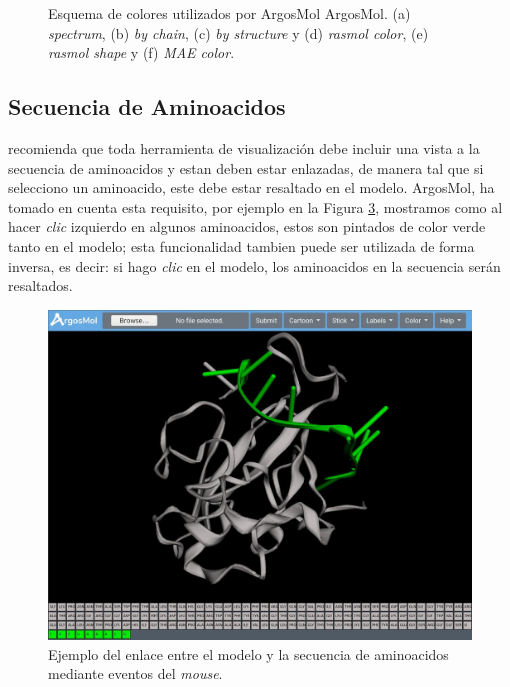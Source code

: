 \documentclass{article}
\begin{document}
\begin{figure}[H]
\begin{subfigure}{.5\textwidth}
		\caption{}
		\label{fig:sfig2}
	\end{subfigure}
	\caption{Esquema de colores utilizados por ArgosMol ArgosMol. (a) \textit{spectrum}, (b) \textit{by chain}, (c) \textit{by structure} y (d) \textit{rasmol color}, (e) \textit{rasmol shape} y (f) \textit{MAE color}. }
	\label{fig:colors}
\end{figure}



\subsection{Secuencia de Aminoacidos}

\cite{youkharibache2017twelve} recomienda que toda herramienta de visualización debe incluir una vista a la secuencia de aminoacidos y estan deben estar enlazadas, de manera tal que si selecciono un aminoacido, este debe estar resaltado en el modelo. ArgosMol, ha tomado en cuenta esta requisito, por ejemplo en la Figura \ref{fig:clic}, mostramos como al hacer \textit{clic} izquierdo en algunos aminoacidos, estos son pintados de color verde tanto en el modelo; esta funcionalidad tambien puede ser utilizada de forma inversa, es decir: si hago \textit{clic} en el modelo, los aminoacidos en la secuencia serán resaltados.

\begin{figure}[H]
	\centering
	\includegraphics[width=\textwidth]{img/argosmol/mol12}
	\caption{ Ejemplo del enlace entre el modelo y la secuencia de aminoacidos mediante eventos del \textit{mouse}. }
	\label{fig:clic}
\end{figure}
\end{document}
